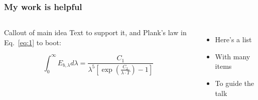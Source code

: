 \begin{frame}
    \frametitle{My work is helpful}

    \begin{columns}


            \begin{blocki}
                {Callout of main idea}
                Text to support it, and Plank's law \citep{planck1914theory} in Eq.~\ref{eq:1} to boot:

                \begin{equation}
                    \int_0^\infty E_{b,\lambda} d\lambda = \frac{C_1}{\lambda^5 \left[ \exp\left( \frac{C_2}{\lambda \cdot T} \right) - 1 \right]}  
                    \label{eq:1}
                \end{equation}


            \end{blocki}


            \begin{itemize}
                \item Here's a list
                \item With many items
                \item To guide the talk
            \end{itemize}


    \end{columns}

\end{frame}

